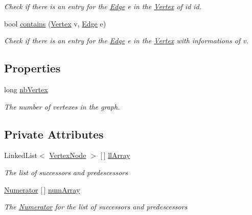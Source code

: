 \begin{DoxyCompactItemize}
\begin{DoxyCompactList}\small\item\em Check if there is an entry for the \hyperlink{classEdge}{Edge} e in the \hyperlink{structVertex}{Vertex} of id \textquotesingle{}id\textquotesingle{}. \end{DoxyCompactList}\item 
bool \hyperlink{classGraph_a180cb9caf5f5783cd92e8be2fff51fab}{contains} (\hyperlink{structVertex}{Vertex} v, \hyperlink{classEdge}{Edge} e)
\begin{DoxyCompactList}\small\item\em Check if there is an entry for the \hyperlink{classEdge}{Edge} e in the \hyperlink{structVertex}{Vertex} with informations of v. \end{DoxyCompactList}\end{DoxyCompactItemize}
\subsection*{Properties}
\begin{DoxyCompactItemize}
\item 
long \hyperlink{classGraph_a7d119b72cbeabd59b9aa99469754ed1c}{nb\+Vertex}
\begin{DoxyCompactList}\small\item\em The number of vertexes in the graph.\end{DoxyCompactList}\end{DoxyCompactItemize}
\subsection*{Private Attributes}
\begin{DoxyCompactItemize}
\item 
Linked\+List$<$ \hyperlink{classVertexNode}{Vertex\+Node} $>$ \mbox{[}$\,$\mbox{]} \hyperlink{classGraph_afc3634d5014c815235e5af25b4580362}{ll\+Array}
\begin{DoxyCompactList}\small\item\em The list of successors and predescessors\end{DoxyCompactList}\item 
\hyperlink{classNumerator}{Numerator} \mbox{[}$\,$\mbox{]} \hyperlink{classGraph_a376dacacf4367c7a7c26c92936cf2d9c}{num\+Array}
\begin{DoxyCompactList}\small\item\em The \hyperlink{classNumerator}{Numerator} for the list of successors and predescessors\end{DoxyCompactList}\end{DoxyCompactItemize}



